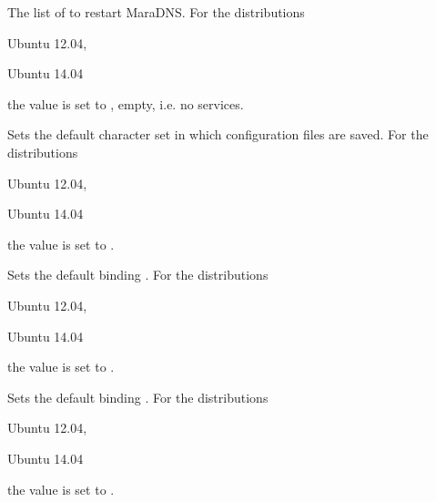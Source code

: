 
The list of  to restart MaraDNS.
For the distributions
\begin{inparaitem}
\item[\TheDistribution{ubuntu}] Ubuntu 12.04,
\item[\TheDistribution{ubuntu}] Ubuntu 14.04
\end{inparaitem}
the value is set to \qcode{}, empty, i.e. no services.


Sets the default character set  in which configuration files are 
saved. For the distributions
\begin{inparaitem}
\item[\TheDistribution{ubuntu}] Ubuntu 12.04,
\item[\TheDistribution{ubuntu}] Ubuntu 14.04
\end{inparaitem}
the value is set to .


Sets the default binding . For the distributions
\begin{inparaitem}
\item[\TheDistribution{ubuntu}] Ubuntu 12.04,
\item[\TheDistribution{ubuntu}] Ubuntu 14.04
\end{inparaitem}
the value is set to .


Sets the default binding . For the distributions
\begin{inparaitem}
\item[\TheDistribution{ubuntu}] Ubuntu 12.04,
\item[\TheDistribution{ubuntu}] Ubuntu 14.04
\end{inparaitem}
the value is set to .

